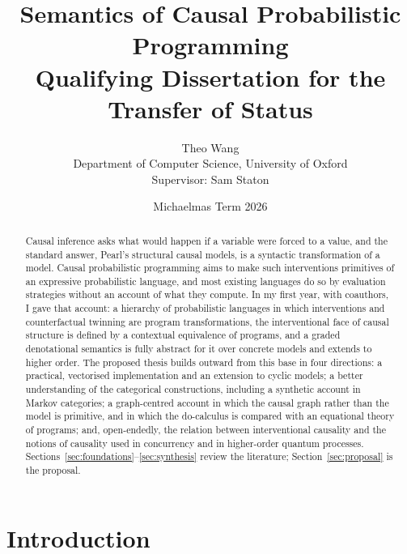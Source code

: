 


\title{Semantics of Causal Probabilistic Programming\\[1ex]
\large Qualifying Dissertation for the Transfer of Status}
\author{Theo Wang\\ \small Department of Computer Science, University of Oxford\\ \small Supervisor: Sam Staton}
\date{Michaelmas Term 2026}



\maketitle

\begin{abstract}
\noindent
Causal inference asks what would happen if a variable were forced to a value, and the standard answer, Pearl's structural causal models, is a syntactic transformation of a model. Causal probabilistic programming aims to make such interventions primitives of an expressive probabilistic language, and most existing languages do so by evaluation strategies without an account of what they compute. In my first year, with coauthors, I gave that account: a hierarchy of probabilistic languages in which interventions and counterfactual twinning are program transformations, the interventional face of causal structure is defined by a contextual equivalence of programs, and a graded denotational semantics is fully abstract for it over concrete models and extends to higher order. The proposed thesis builds outward from this base in four directions: a practical, vectorised implementation and an extension to cyclic models; a better understanding of the categorical constructions, including a synthetic account in Markov categories; a graph-centred account in which the causal graph rather than the model is primitive, and in which the do-calculus is compared with an equational theory of programs; and, open-endedly, the relation between interventional causality and the notions of causality used in concurrency and in higher-order quantum processes. Sections~\ref{sec:foundations}--\ref{sec:synthesis} review the literature; Section~\ref{sec:proposal} is the proposal.
\end{abstract}

\tableofcontents

\section{Introduction}\label{sec:intro}






\printbibliography


